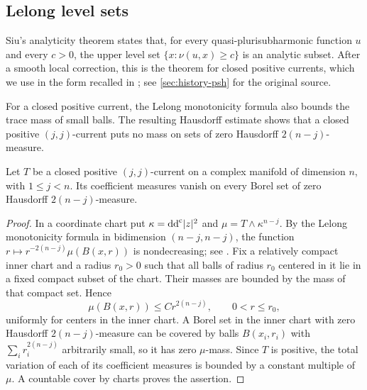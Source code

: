 \subsection{Lelong level sets}
\label{subsec:psh-lelong-levels}

Siu's analyticity theorem states that, for every quasi-plurisubharmonic function $u$ and every $c>0$, the upper level set $\{x:\nu(u,x)\geq c\}$ is an analytic subset. After a smooth local correction, this is the theorem for closed positive currents, which we use in the form recalled in \cite{SGPT}; see \cref{sec:history-psh} for the original source.

For a closed positive current, the Lelong monotonicity formula also bounds the trace mass of small balls. The resulting Hausdorff estimate shows that a closed positive $(j,j)$-current puts no mass on sets of zero Hausdorff $2(n-j)$-measure.

\begin{corollary}\label{cor:closed-current-hausdorff-null}
Let $T$ be a closed positive $(j,j)$-current on a complex manifold of dimension $n$, with $1\leq j<n$. Its coefficient measures vanish on every Borel set of zero Hausdorff $2(n-j)$-measure.
\end{corollary}
\begin{proof}
In a coordinate chart put $\kappa=\mathrm{dd}^{\mathrm{c}}|z|^2$ and $\mu=T\wedge\kappa^{n-j}$. By the Lelong monotonicity formula in bidimension $(n-j,n-j)$, the function $r\mapsto r^{-2(n-j)}\mu(B(x,r))$ is nondecreasing; see \cite[Chapter III, formulas (5.5)--(5.8), pp.~158--159]{DemCADG}. Fix a relatively compact inner chart and a radius $r_0>0$ such that all balls of radius $r_0$ centered in it lie in a fixed compact subset of the chart. Their masses are bounded by the mass of that compact set. Hence
\[
 \mu(B(x,r))\leq Cr^{2(n-j)},\qquad 0<r\leq r_0,
\]
uniformly for centers in the inner chart. A Borel set in the inner chart with zero Hausdorff $2(n-j)$-measure can be covered by balls $B(x_i,r_i)$ with $\sum_ir_i^{2(n-j)}$ arbitrarily small, so it has zero $\mu$-mass. Since $T$ is positive, the total variation of each of its coefficient measures is bounded by a constant multiple of $\mu$. A countable cover by charts proves the assertion.
\end{proof}





